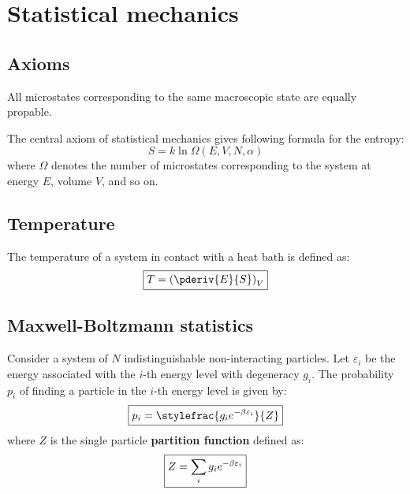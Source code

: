 \chapter{Statistical mechanics}

\section{Axioms}
    
    \begin{theorem}
    	All microstates corresponding to the same macroscopic state are equally propable.
    \end{theorem}
	\begin{theorem}
    	The central axiom of statistical mechanics gives following formula for the entropy:
		\begin{equation}
			\label{statmech:boltzmann_formula}
            \boxed{S = k\ln\Omega(E, V, N, \alpha)}
		\end{equation}
        where $\Omega$ denotes the number of microstates corresponding to the system at energy $E$, volume $V$, and so on.
	\end{theorem}
    
	\section{Temperature}
    	The temperature of a system in contact with a heat bath is defined as:
    	\begin{equation}
        	\label{statmech:temperature}
			\boxed{T = \left(\pderiv{E}{S}\right)_V}
		\end{equation}
    
\section{Maxwell-Boltzmann statistics}

    	Consider a system of $N$ indistinguishable non-interacting particles. Let $\varepsilon_i$ be the energy associated with the $i$-th energy level with degeneracy $g_i$. The probability $p_i$ of finding a particle in the $i$-th energy level is given by:
    	\begin{equation}
			\boxed{p_i = \stylefrac{g_i e^{-\beta\varepsilon_i}}{Z}}
		\end{equation}
        where $Z$ is the single particle \textbf{partition function} defined as:
        \begin{equation}\index{partition function}
			\label{statmech:partition_function}
            \boxed{Z = \sum_i{g_ie^{-\beta\varepsilon_i}}}
		\end{equation}
        
